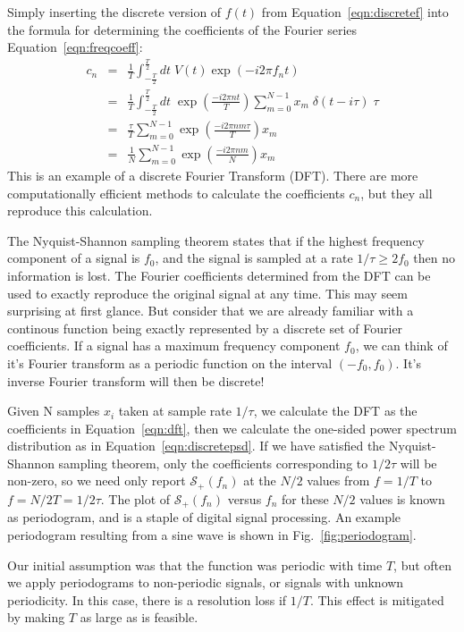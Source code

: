 \documentclass[12pt]{article}
\begin{document}
Simply inserting the discrete version of $f(t)$ from Equation~\ref{eqn:discretef} into the formula for determining the coefficients of the Fourier series Equation~\ref{eqn:freqcoeff}:
\begin{eqnarray}
c_n &=& \frac{1}{T} \int_{-\frac{T}{2}}^{\frac{T}{2}} dt \; V(t) \exp(-i2\pi f_n t) \nonumber \\
&=& \frac{1}{T} \int_{-\frac{T}{2}}^{\frac{T}{2}} dt \; \exp\left(\frac{-i2\pi n t}{T} \right) \sum_{m=0}^{N-1} x_m\; 
\delta(t - i\tau) \; \tau \nonumber \\
&=& \frac{\tau}{T}  \sum_{m=0}^{N-1} \exp\left(\frac{-i2\pi n m \tau }{T} \right)  x_m \nonumber \\
&=& \frac{1}{N}  \sum_{m=0}^{N-1} \exp\left(\frac{-i2\pi n m }{N} \right)  x_m \label{eqn:dft}
\end{eqnarray}
This is an example of a discrete Fourier Transform (DFT).  There are more computationally efficient methods to calculate the coefficients $c_n$, but they all reproduce this calculation.  

The Nyquist-Shannon sampling theorem states that if the highest frequency component of a signal is $f_0$, and the signal is sampled at a rate $1/\tau \geq 2f_0$ then no information is lost.  The Fourier coefficients determined from the DFT can be used to exactly reproduce the original signal at any time.  This may seem surprising at first glance.  But consider that we are already familiar with a continous function being exactly represented by a discrete set of Fourier coefficients.  If a signal has a maximum frequency component $f_0$, we can think of it's Fourier transform as a periodic function on the interval $(-f_0, f_0)$.  It's inverse Fourier transform will then be discrete!

Given N samples $x_i$ taken at sample rate $1/\tau$, we calculate the DFT as the coefficients in Equation~\ref{eqn:dft}, then we calculate the one-sided power spectrum distribution as in Equation~\ref{eqn:discretepsd}.  If we have satisfied the Nyquist-Shannon sampling theorem, only the coefficients corresponding to $1/2\tau$ will be non-zero, so we need only report $\mathcal{S}_{+}(f_n)$ at the $N/2$ values from $f=1/T$ to $f=N/2T=1/2\tau$.  The plot of $\mathcal{S}_{+}(f_n)$ versus $f_n$ for these $N/2$ values is known as periodogram, and is a staple of digital signal processing.  An example periodogram resulting from a sine wave is shown in Fig.~\ref{fig:periodogram}.

Our initial assumption was that the function was periodic with time $T$, but often we apply periodograms to non-periodic signals, or signals with unknown periodicity.  In this case, there is a resolution loss if $1/T$.  This effect is mitigated by making $T$ as large as is feasible. 
\end{document}
